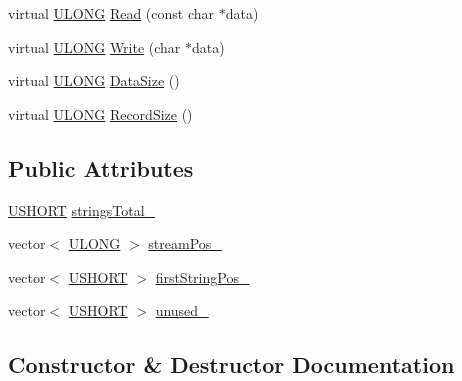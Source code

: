 \begin{DoxyCompactItemize}
\item 
virtual \hyperlink{_basic_excel_8hpp_abe09d1bea023be6a07cbadde8e955435}{U\+L\+O\+N\+G} \hyperlink{struct_y_excel_1_1_workbook_1_1_ext_s_s_t_af5575fb5ef12f97b068b9d98e33397d2}{Read} (const char $\ast$data)
\item 
virtual \hyperlink{_basic_excel_8hpp_abe09d1bea023be6a07cbadde8e955435}{U\+L\+O\+N\+G} \hyperlink{struct_y_excel_1_1_workbook_1_1_ext_s_s_t_a950704f2181dca299308966429766e73}{Write} (char $\ast$data)
\item 
virtual \hyperlink{_basic_excel_8hpp_abe09d1bea023be6a07cbadde8e955435}{U\+L\+O\+N\+G} \hyperlink{struct_y_excel_1_1_workbook_1_1_ext_s_s_t_a7b5ee0b8ed5bb877c10ed47b8fa7d7ab}{Data\+Size} ()
\item 
virtual \hyperlink{_basic_excel_8hpp_abe09d1bea023be6a07cbadde8e955435}{U\+L\+O\+N\+G} \hyperlink{struct_y_excel_1_1_workbook_1_1_ext_s_s_t_a6bb8458025c7d378f0f9f35862e87e82}{Record\+Size} ()
\end{DoxyCompactItemize}
\subsection*{Public Attributes}
\begin{DoxyCompactItemize}
\item 
\hyperlink{_basic_excel_8hpp_a5850d5316caf7f4cedd742fdf8cd7c02}{U\+S\+H\+O\+R\+T} \hyperlink{struct_y_excel_1_1_workbook_1_1_ext_s_s_t_acf8f2203f77e4676f74e9cedfe708f6f}{strings\+Total\+\_\+}
\item 
vector$<$ \hyperlink{_basic_excel_8hpp_abe09d1bea023be6a07cbadde8e955435}{U\+L\+O\+N\+G} $>$ \hyperlink{struct_y_excel_1_1_workbook_1_1_ext_s_s_t_a391c60203fcba748a44ff701ac6930d4}{stream\+Pos\+\_\+}
\item 
vector$<$ \hyperlink{_basic_excel_8hpp_a5850d5316caf7f4cedd742fdf8cd7c02}{U\+S\+H\+O\+R\+T} $>$ \hyperlink{struct_y_excel_1_1_workbook_1_1_ext_s_s_t_a10639f12d8fc736003f16da194ceab98}{first\+String\+Pos\+\_\+}
\item 
vector$<$ \hyperlink{_basic_excel_8hpp_a5850d5316caf7f4cedd742fdf8cd7c02}{U\+S\+H\+O\+R\+T} $>$ \hyperlink{struct_y_excel_1_1_workbook_1_1_ext_s_s_t_a41f220283aec8c7e6e3c89a0b1ae245d}{unused\+\_\+}
\end{DoxyCompactItemize}


\subsection{Constructor \& Destructor Documentation}
\hypertarget{struct_y_excel_1_1_workbook_1_1_ext_s_s_t_a28262d2aa0c78deea6035abd9696e5fd}{}
